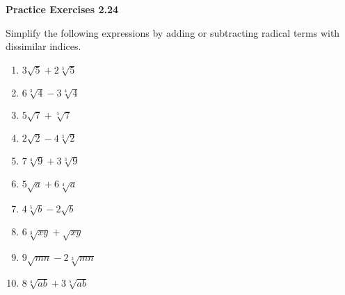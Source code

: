 \vspace{1ex}
\noindent\textbf{Practice Exercises 2.24}

\vspace{0.75ex}

Simplify the following expressions by adding or subtracting radical terms with dissimilar indices.

\begin{multicols}{2}
\begin{enumerate}[noitemsep, label = \color{blue}\arabic*. ]
    \item $3\sqrt{5} + 2\sqrt[3]{5}$
    \item $6\sqrt[{\scriptstyle 3}]{4} - 3\sqrt[{\scriptstyle 4}]{4}$
    \item $5\sqrt{7} + \sqrt[{\scriptstyle 5}]{7}$
    \item $2\sqrt{2} - 4\sqrt[{\scriptstyle 3}]{2}$
    \item $7\sqrt[{\scriptstyle 4}]{9} + 3\sqrt[{\scriptstyle 3}]{9}$
    \item $5\sqrt{a} + 6\sqrt[{\scriptstyle 4}]{a}$
    \item $4\sqrt[{\scriptstyle 5}]{b} - 2\sqrt{b}$
    \item $6\sqrt[{\scriptstyle 3}]{xy} + \sqrt{xy}$
    \item $9\sqrt{mn} - 2\sqrt[{\scriptstyle 3}]{mn}$
    \item $8\sqrt[{\scriptstyle 4}]{ab} + 3\sqrt[{\scriptstyle 5}]{ab}$
\end{enumerate}
\end{multicols}

